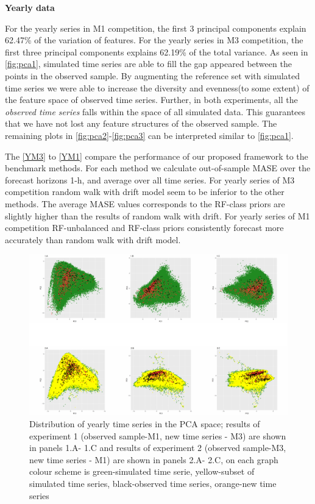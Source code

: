 \documentclass[11pt,a4paper,]{article}
\theoremstyle{definition}
\theoremstyle{definition}
\theoremstyle{definition}
\theoremstyle{remark}
\begin{document}
\textbf{Yearly data}

For the yearly series in M1 competition, the first 3 principal
components explain 62.47\% of the variation of features. For the yearly
series in M3 competition, the first three principal components explains
62.19\% of the total variance. As seen in \autoref{fig:pca1}, simulated
time series are able to fill the gap appeared between the points in the
observed sample. By augmenting the reference set with simulated time
series we were able to increase the diversity and evenness(to some
extent) of the feature space of observed time series. Further, in both
experiments, all the \emph{observed time series} falls within the space
of all simulated data. This guarantees that we have not lost any feature
structures of the observed sample. The remaining plots in
\autoref{fig:pca2}-\autoref{fig:pca3} can be interpreted similar to
\autoref{fig:pca1}.

The \autoref{YM3} to \autoref{YM1} compare the performance of our
proposed framework to the benchmark methods. For each method we
calculate out-of-sample MASE over the forecast horizons 1-h, and average
over all time series. For yearly series of M3 competition random walk
with drift model seem to be inferior to the other methods. The average
MASE values corresponds to the RF-class priors are slightly higher than
the results of random walk with drift. For yearly series of M1
competition RF-unbalanced and RF-class priors consistently forecast more
accurately than random walk with drift model.

\begin{figure}

{\centering \includegraphics[width=\textwidth]{figure/pca1-1} 

}

\caption{Distribution of yearly time series in the PCA space; results of experiment 1 (observed sample-M1, new time series - M3) are shown in panels 1.A- 1.C and results of experiment 2 (observed sample-M3, new time series - M1) are shown in panels 2.A- 2.C, on each graph colour scheme is green-simulated time serie, yellow-subset of simulated time series, black-observed time series, orange-new time series}\label{fig:pca1}
\end{figure}
\end{document}
